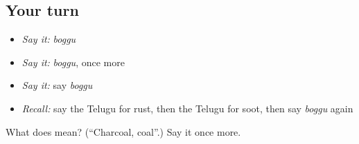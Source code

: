 \subsection*{Your turn}
\begin{itemize}
\raggedright
  \item \emph{Say it:} \emph{boggu}
  \item \emph{Say it:} \emph{boggu}, once more
  \item \emph{Say it:} say \emph{boggu}
  \item \emph{Recall:} say the Telugu for rust, then the Telugu for soot, then say \emph{boggu} again
\end{itemize}

\begin{tcolorbox}[breakable,colback=teal!4,colframe=teal!35!black,title={Before you move on}]
What does  mean? (\textquotedblleft{}Charcoal, coal\textquotedblright{}.) Say it once more.
\end{tcolorbox}

